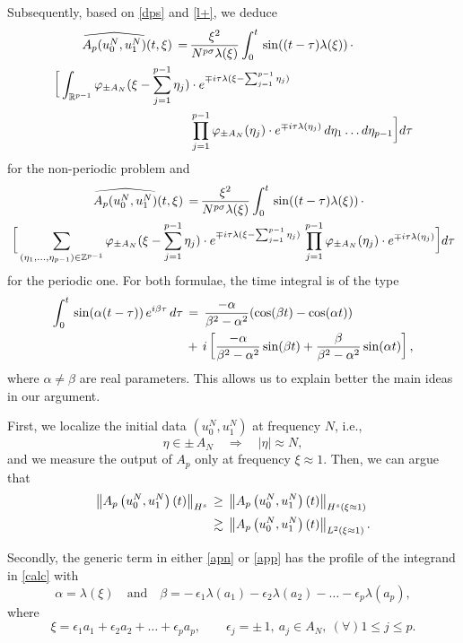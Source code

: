 \documentclass{amsart}
\newcommand{\R}{\mathbb{R}}
\begin{document}
Subsequently, based on \eqref{dps} and \eqref{l+}, we deduce
\begin{equation}
\aligned
\widehat{A_p(u^N_0,u^N_1)}(t,\xi)\,=\,& \frac{\xi^2}{N^{p\sigma}\lambda(\xi)}\int_0^t \,\sin((t-\tau) \lambda(\xi))\,\cdot\\
\bigg[\int_{\R^{p-1}}\varphi_{\pm A_N}(\xi-\sum_{j=1}^{p-1} \eta_j)&\cdot e^{\mp i\tau\lambda(\xi-\sum_{j=1}^{p-1}\eta_j)}\,
\\
& \prod_{j=1}^{p-1}\varphi_{\pm A_N}(\eta_j)\cdot e^{\mp
i\tau\lambda(\eta_j)}\,d\eta_1\ldots d\eta_{p-1}\bigg]d\tau
\endaligned
\label{apn}
\end{equation}
for the non-periodic problem and 
\begin{equation}
\aligned
\widehat{A_p(u^N_0,u^N_1)}(t,\xi)\,=\,& \frac{\xi^2}{N^{p\sigma}\lambda(\xi)}\int_0^t \,\sin((t-\tau) \lambda(\xi))\,\cdot\\
\bigg[\sum_{(\eta_1, \ldots, \eta_{p-1})\in \mathbb{Z}^{p-1}}\varphi_{\pm A_N}(\xi-\sum_{j=1}^{p-1} \eta_j)&\cdot e^{\mp i\tau\lambda(\xi-\sum_{j=1}^{p-1}\eta_j)}\,
\prod_{j=1}^{p-1}\varphi_{\pm A_N}(\eta_j)\cdot e^{\mp i\tau\lambda(\eta_j)}\bigg]d\tau
\endaligned
\label{app}
\end{equation}
for the periodic one. For both formulae, the time integral is of the type
\begin{equation}
\aligned
\int_0^t\,\sin(\alpha(t-\tau))\,e^{i\beta \tau}\,d\tau\,&=\,\frac{-\alpha}{\beta^2-\alpha^2}(\cos (\beta t)-\cos (\alpha t))\\
&+\,i\left[\frac{-\alpha}{\beta^2-\alpha^2}\sin (\beta t) + \frac{\beta}{\beta^2-\alpha^2}\sin (\alpha t)\right],
\endaligned
\label{calc}
\end{equation}
where $\alpha\neq \beta$ are real parameters. This allows us to explain better the main ideas in our argument. 

First, we localize the initial data $(u^N_0,u^N_1)$ at frequency $N$, i.e.,
\[
\eta\in \pm \,A_N\quad \Longrightarrow \quad |\eta| \approx N,\]
and we measure the output of $A_p$ only at frequency $\xi \approx 1$. Then, we can argue that
\begin{equation}
\aligned
\left\|A_{p}\left(u_0^N,u_1^N\right)(t)\right\|_{H^s}\,&\geq\, \left\|A_{p}\left(u_0^N,u_1^N\right)(t)\right\|_{H^{s}(\xi \approx 1)}\\
&\gtrsim\, \left\|A_{p}\left(u_0^N,u_1^N\right)(t)\right\|_{L^2(\xi \approx 1)}.
\endaligned
\label{aphs}
\end{equation}

Secondly, the generic term in either \eqref{apn} or \eqref{app} has the profile of the integrand in \eqref{calc} with
\begin{equation}
\alpha=\lambda(\xi) \quad \text{and} \quad \beta= -\,\epsilon_1\lambda(a_1)-\epsilon_2\lambda(a_2)-\ldots-\epsilon_p\lambda(a_p),
\label{ab}
\end{equation}
where
\begin{equation}
\xi=  \epsilon_1 a_1+\epsilon_2 a_2+ \ldots+\epsilon_p a_p, \qquad \epsilon_j=\pm \,1, \ a_j\in A_N, \ (\forall)1\leq j\leq p.\label{xi}
\end{equation}
\end{document}
